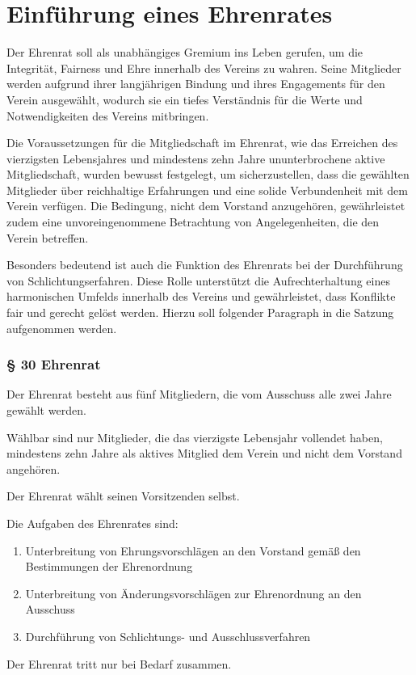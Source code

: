 \documentclass[10pt,a4paper,parskip=half]{scrartcl}
\newcommand{\change}[1]{
  \begin{adjustwidth}{20pt}{20pt}
    #1
  \end{adjustwidth}
}
\begin{document}
\section{Einführung eines Ehrenrates}
Der Ehrenrat soll als unabhängiges Gremium ins Leben gerufen, um die Integrität, Fairness und Ehre innerhalb des Vereins zu wahren. Seine Mitglieder werden aufgrund ihrer langjährigen Bindung und ihres Engagements für den Verein ausgewählt, wodurch sie ein tiefes Verständnis für die Werte und Notwendigkeiten des Vereins mitbringen.

Die Voraussetzungen für die Mitgliedschaft im Ehrenrat, wie das Erreichen des vierzigsten Lebensjahres und mindestens zehn Jahre ununterbrochene aktive Mitgliedschaft, wurden bewusst festgelegt, um sicherzustellen, dass die gewählten Mitglieder über reichhaltige Erfahrungen und eine solide Verbundenheit mit dem Verein verfügen. Die Bedingung, nicht dem Vorstand anzugehören, gewährleistet zudem eine unvoreingenommene Betrachtung von Angelegenheiten, die den Verein betreffen.

Besonders bedeutend ist auch die Funktion des Ehrenrats bei der Durchführung von Schlichtungserfahren. Diese Rolle unterstützt die Aufrechterhaltung eines harmonischen Umfelds innerhalb des Vereins und gewährleistet, dass Konflikte fair und gerecht gelöst werden.
Hierzu soll folgender Paragraph in die Satzung aufgenommen werden.
\change{
  \subsubsection*{§ 30 Ehrenrat}
  Der Ehrenrat besteht aus fünf Mitgliedern, die vom Ausschuss alle zwei Jahre gewählt werden.

  Wählbar sind nur Mitglieder, die das vierzigste Lebensjahr vollendet haben, mindestens zehn Jahre als aktives Mitglied dem Verein und nicht dem Vorstand angehören.

  Der Ehrenrat wählt seinen Vorsitzenden selbst.

  Die Aufgaben des Ehrenrates sind:

  \begin{enumerate}[label=\alph*),noitemsep]
    \item Unterbreitung von Ehrungsvorschlägen an den Vorstand gemäß den Bestimmungen der Ehrenordnung
    \item Unterbreitung von Änderungsvorschlägen zur Ehrenordnung an den Ausschuss
    \item Durchführung von Schlichtungs- und Ausschlussverfahren
  \end{enumerate}

  Der Ehrenrat tritt nur bei Bedarf zusammen.
}
\end{document}
